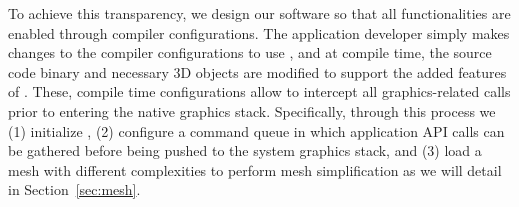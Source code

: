 
To achieve this transparency, we design our software so that all {\myit} functionalities are enabled through compiler configurations. The application developer simply makes changes to the compiler configurations to use {\myit}, and at compile time, the source code binary and necessary 3D objects are modified to support the added features of {\myit}. 
%
These, compile time configurations allow {\myit} to intercept all graphics-related calls prior to entering the native graphics stack. Specifically, through this process we (1) initialize {\myit}, (2) configure a command queue in which application API calls can be gathered before being pushed to the system graphics stack, and (3) load a mesh with different complexities to perform mesh simplification as we will detail in Section~\ref{sec:mesh}. 


%
%
%
%




